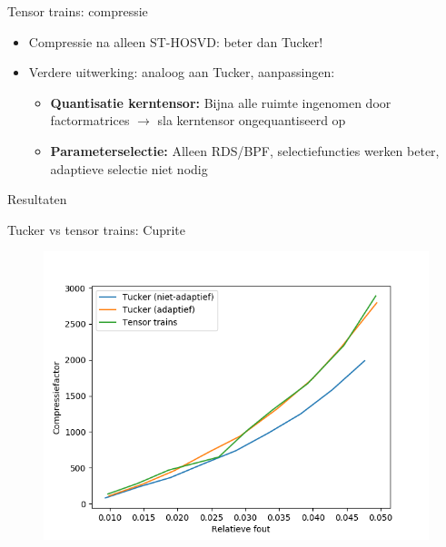 \documentclass[t,12pt,dutch
\ifx\beamermode\undefined\else,\beamermode\fi
]{beamer}
\begin{document}
\begin{frame}{Tensor trains: compressie}

\begin{itemize}
\item Compressie na alleen ST-HOSVD: beter dan Tucker!
\item Verdere uitwerking: analoog aan Tucker, aanpassingen:
\begin{itemize}
\item \textbf{Quantisatie kerntensor:} Bijna alle ruimte ingenomen door factormatrices $\rightarrow$ sla kerntensor ongequantiseerd op
\item \textbf{Parameterselectie:} Alleen RDS/BPF, selectiefuncties werken beter, adaptieve selectie niet nodig
\end{itemize}
\end{itemize}

\end{frame}


\begin{frame}{}
\begin{center}
\vspace*{\fill}
\vspace*{\fill}
\Huge
Resultaten
\normalsize
\vspace*{\fill}
\end{center}
\end{frame}

\begin{frame}{Tucker vs tensor trains: Cuprite}

\begin{figure}[H]
\centering
\includegraphics[scale=0.5]{images/tucker_vs_tensor_trains_Cuprite.png}
\end{figure}

\end{frame}
\end{document}
